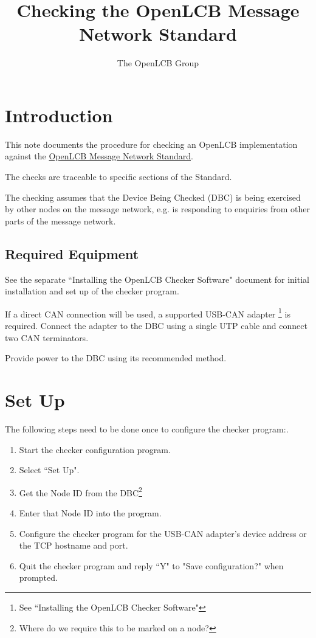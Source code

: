 \documentclass[11pt]{article}
\title{Checking the OpenLCB Message Network Standard}
\author{The OpenLCB Group}
\begin{document}
\maketitle


\section{Introduction}

This note documents the procedure for checking an OpenLCB implementation against the 
\href{https://nbviewer.org/github/openlcb/documents/blob/master/standards/MessageNetworkS.pdf}
    {OpenLCB Message Network Standard}.

The checks are traceable to specific sections of the Standard.

The checking assumes that the Device Being Checked (DBC) is being exercised by other
nodes on the message network, 
e.g. is responding to enquiries from other parts of the message network.

\subsection{Required Equipment}

See the separate ``Installing the OpenLCB Checker Software" document for initial installation 
and set up of the checker program.

If a direct CAN connection will be used,
a supported USB-CAN adapter
    \footnote{See ``Installing the OpenLCB Checker Software"}
is required. 
Connect the adapter to the DBC using a single UTP cable and connect two CAN terminators.

Provide power to the DBC using its recommended method.

\section{Set Up}
The following steps need to be done once to configure the checker program:.
\begin{enumerate}
\item Start the checker configuration program. 
\item Select ``Set Up".
\item Get the Node ID from the DBC\footnote{Where do we require this to be marked on a node?} 
\item Enter that Node ID into the program.
\item Configure the checker program for the USB-CAN adapter's device address
        or the TCP hostname and port.
\item Quit the checker program and reply ``Y" to "Save configuration?" when prompted.
\end{enumerate}
\end{document}
